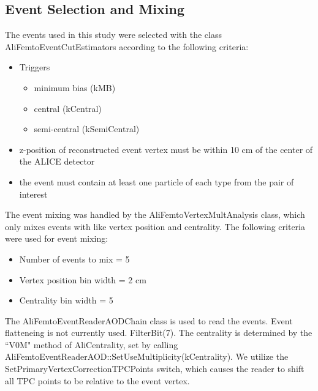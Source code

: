 \documentclass[/home/jesse/Analysis/FemtoAnalysis/AnalysisNotes/AnalysisNoteJBuxton.tex]{subfiles}
\begin{document}
\subsection{Event Selection and Mixing}
\label{EventSelection}

The events used in this study were selected with the class AliFemtoEventCutEstimators according to the following criteria:

\begin{itemize}
 \itemsep0em
 \item Triggers
 \begin{itemize}
  \itemsep0em
  \item minimum bias (kMB)
  \item central (kCentral)
  \item semi-central (kSemiCentral)
 \end{itemize}
 \item z-position of reconstructed event vertex must be within 10 cm of the center of the ALICE detector
 \item the event must contain at least one particle of each type from the pair of interest
\end{itemize}

The event mixing was handled by the AliFemtoVertexMultAnalysis class, which only mixes events with like vertex position and centrality.
The following criteria were used for event mixing:

\begin{itemize}
 \itemsep0em
 \item Number of events to mix = 5
 \item Vertex position bin width = 2 cm
 \item Centrality bin width = 5%
\end{itemize}

The AliFemtoEventReaderAODChain class is used to read the events.
Event flatteneing is not currently used.
FilterBit(7).
The centrality is determined by the ``V0M" method of AliCentrality, set by calling AliFemtoEventReaderAOD::SetUseMultiplicity(kCentrality).
We utilize the SetPrimaryVertexCorrectionTPCPoints switch, which causes the reader to shift all TPC points to be relative to the event vertex.
\end{document}
